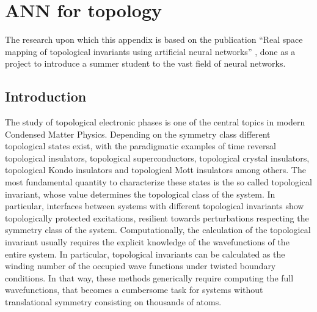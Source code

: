 \chapter{ANN for topology}
\label{ch:ANN}
The research upon which this appendix is based on the publication ``Real space mapping of topological invariants using artificial neural networks'' , done as a project to introduce a summer student to the vast field of neural networks.

\section{Introduction}
The study of topological electronic phases is one of the central topics %
in modern Condensed Matter Physics. Depending on the symmetry class different
topological states exist, with the paradigmatic examples of
time reversal topological insulators,\cite{RevModPhys.82.3045}
topological superconductors,\cite{RevModPhys.83.1057}
topological crystal insulators,\cite{PhysRevLett.106.106802}
topological Kondo insulators\cite{PhysRevLett.104.106408} and
topological Mott insulators\cite{PhysRevLett.100.156401} among others.
The most fundamental quantity to characterize these states is the so called
topological invariant, whose value determines the topological class of the
system.
In particular, interfaces between systems with different topological invariants
show topologically protected excitations, resilient towards perturbations
respecting the symmetry class of the system.
Computationally, the calculation of the topological invariant usually requires
the explicit knowledge of the wavefunctions of the entire 
system.\cite{PhysRevB.83.235401,PhysRevB.95.075146,wu2017wanniertools}
In particular,
topological invariants can
be calculated as the winding number of the 
occupied wave functions 
under
twisted boundary
conditions.\cite{PhysRevB.83.235401,PhysRevB.95.075146,wu2017wanniertools}
In that way, these methods generically require computing the full
wavefunctions, that becomes a cumbersome task for
systems without translational symmetry consisting on thousands
of atoms.


